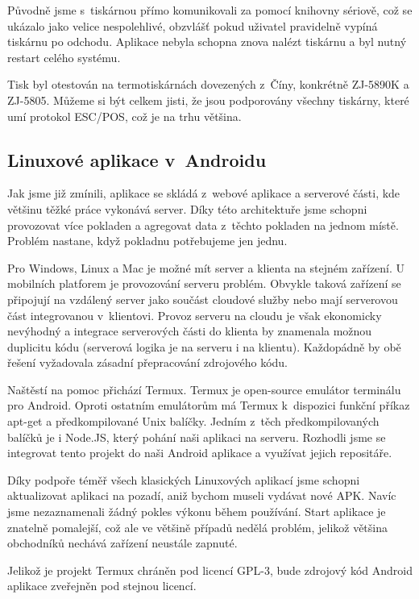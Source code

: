\documentclass[a4paper,11pt,oneside]{article}
\begin{document}
Původně jsme s~tiskárnou přímo komunikovali za pomocí knihovny sériově, což se ukázalo jako velice nespolehlivé, obzvlášť pokud uživatel pravidelně vypíná tiskárnu po odchodu. Aplikace nebyla schopna znova nalézt tiskárnu a byl nutný restart celého systému. 

Tisk byl otestován na termotiskárnách dovezených z~Číny, konkrétně ZJ-5890K a ZJ-5805. Můžeme si být celkem jisti, že jsou podporovány všechny tiskárny, které umí protokol ESC/POS, což je na trhu většina.

\subsection{Linuxové aplikace v~Androidu}

Jak jsme již zmínili, aplikace se skládá z~webové aplikace a serverové části, kde většinu těžké práce vykonává server. Díky této architektuře jsme schopni provozovat více pokladen a agregovat data z~těchto pokladen na jednom místě. Problém nastane, když pokladnu potřebujeme jen jednu. 

Pro Windows, Linux a Mac je možné mít server a klienta na stejném zařízení. U mobilních platforem je provozování serveru problém. Obvykle taková zařízení se připojují na vzdálený server jako součást cloudové služby nebo mají serverovou část integrovanou v~klientovi. Provoz serveru na cloudu je však ekonomicky nevýhodný a integrace serverových části do klienta by znamenala možnou duplicitu kódu (serverová logika je na serveru i na klientu). Každopádně by obě řešení vyžadovala zásadní přepracování zdrojového kódu.

Naštěstí na pomoc přichází Termux\cite{termux}. Termux je open-source emulátor terminálu pro Android. Oproti ostatním emulátorům má Termux k~dispozici funkční příkaz apt-get a předkompilované Unix balíčky. Jedním z~těch předkompilovaných balíčků je i Node.JS, který pohání naši aplikaci na serveru. Rozhodli jsme se integrovat tento projekt do naši Android aplikace a využívat jejich repositáře.

Díky podpoře téměř všech klasických Linuxových aplikací jsme schopni aktualizovat aplikaci na pozadí, aniž bychom museli vydávat nové APK. Navíc jsme nezaznamenali žádný pokles výkonu během používání. Start aplikace je znatelně pomalejší, což ale ve většině případů nedělá problém, jelikož většina obchodníků nechává zařízení neustále zapnuté. 

Jelikož je projekt Termux chráněn pod licencí GPL-3, bude zdrojový kód Android aplikace zveřejněn pod stejnou licencí. 
\end{document}
